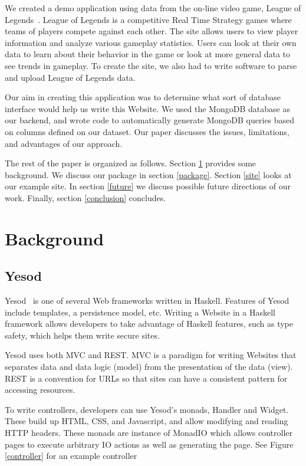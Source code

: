 \documentclass[letterpaper,twocolumn,9pt]{article}
\begin{document}
We created a demo application using data from the on-line video game, League of Legends~\cite{lol}. League of Legends is a competitive Real Time Strategy games where teams of players compete against each other. The site allows users to view player information and analyze various gameplay statistics. Users can look at their own data to learn about their behavior in the game or look at more general data to see trends in gameplay. To create the site, we also had to write software to parse and upload League of Legends data. 

Our aim in creating this application was to determine what sort of database interface would help us write this Website. We used the MongoDB\cite{mongo} database as our backend, and wrote code to automatically generate MongoDB queries based on columns defined on our dataset. Our paper discusses the issues, limitations, and advantages of our approach.

The rest of the paper is organized as follows. Section \ref{sec:background} provides some background. We discuss our package in section \ref{package}. Section \ref{site} looks at our example site. In section \ref{future} we discuss possible future directions of our work. Finally, section \ref{conclusion} concludes.

\section{Background}
\label{sec:background}

\subsection{Yesod}

Yesod~\cite{yesod} is one of several Web frameworks written in Haskell. Features of Yesod include templates, a persistence model, etc. Writing a Website in a Haskell framework allows developers to take advantage of Haskell features, such as type safety, which helps them write secure sites.

Yesod uses both MVC and REST. MVC is a paradigm for writing Websites that separates data and data logic (model) from the presentation of the data (view). REST is a convention for URLs so that sites can have a consistent pattern for accessing resources.

To write controllers, developers can use Yesod's monads, Handler and Widget. These build up HTML, CSS, and Javascript, and allow modifying and reading HTTP headers. These monads are instance of MonadIO which allows controller pages to execute arbitrary IO actions as well as generating the page. See Figure \ref{controller} for an example controller
\end{document}
